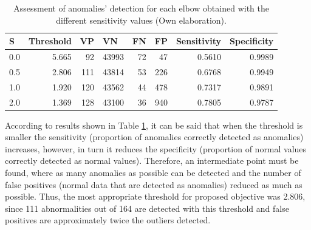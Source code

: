 \begin{table}[H]
\centering
\begin{center}
\begin{tabular}{|l|r|r|r|r|r|r|r|}
\hline
\textbf{S} & \multicolumn{1}{l|}{\textbf{Threshold}} & \multicolumn{1}{l|}{\textbf{VP}} & \multicolumn{1}{l|}{\textbf{VN}}& \multicolumn{1}{l|}{\textbf{FN}}& \multicolumn{1}{l|}{\textbf{FP}} & \multicolumn{1}{l|}{\textbf{Sensitivity}} & \multicolumn{1}{l|}{\textbf{Specificity}} \\ \hline
0.0 & 5.665 & \cellcolor[HTML]{AADD99} 92 & \cellcolor[HTML]{AADD99} 43993 & \cellcolor[HTML]{FFCE93} 72 & \cellcolor[HTML]{FFCE93} 47 & 0.5610 & 0.9989 \\ \hline
0.5  & 2.806 & \cellcolor[HTML]{AADD99} 111 & \cellcolor[HTML]{AADD99} 43814 & \cellcolor[HTML]{FFCE93} 53 & \cellcolor[HTML]{FFCE93} 226 & 0.6768 & 0.9949 \\ \hline
1.0 &  1.920 & \cellcolor[HTML]{AADD99} 120 & \cellcolor[HTML]{AADD99} 43562 & \cellcolor[HTML]{FFCE93} 44 & \cellcolor[HTML]{FFCE93} 478 & 0.7317 & 0.9891 \\ \hline
2.0 & 1.369	 & \cellcolor[HTML]{AADD99} 128 & \cellcolor[HTML]{AADD99} 43100  & \cellcolor[HTML]{FFCE93} 36 & \cellcolor[HTML]{FFCE93} 940 & 0.7805 & 0.9787 \\ \hline
\end{tabular}
\end{center}
\caption{Assessment of anomalies' detection for each elbow obtained with the different sensitivity values (Own elaboration).}
\label{table:evaluacion_codos}
\end{table}

According to results shown in Table \ref{table:evaluacion_codos}, it can be said that when the threshold is smaller the sensitivity (proportion of anomalies correctly detected as anomalies) increases, however, in turn it reduces the specificity (proportion of normal values correctly detected as normal values). Therefore, an intermediate point must be found, where as many anomalies as possible can be detected and the number of false positives (normal data that are detected as anomalies) reduced as much as possible. Thus, the most appropriate threshold for proposed objective was 2.806, since 111 abnormalities out of 164 are detected with this threshold and false positives are approximately twice the outliers detected.

